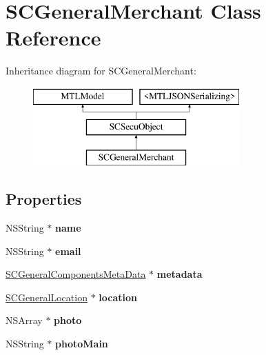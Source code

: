\hypertarget{interface_s_c_general_merchant}{}\section{S\+C\+General\+Merchant Class Reference}
\label{interface_s_c_general_merchant}
Inheritance diagram for S\+C\+General\+Merchant\+:\begin{figure}[H]
\begin{center}
\leavevmode
\includegraphics[height=3.000000cm]{interface_s_c_general_merchant}
\end{center}
\end{figure}
\subsection*{Properties}
\begin{DoxyCompactItemize}
\item 
N\+S\+String $\ast$ {\bfseries name}\hypertarget{interface_s_c_general_merchant_a9df90bf0f3cc8ef79dcb7779d43f4e20}{}\label{interface_s_c_general_merchant_a9df90bf0f3cc8ef79dcb7779d43f4e20}

\item 
N\+S\+String $\ast$ {\bfseries email}\hypertarget{interface_s_c_general_merchant_af5798e1548df7f7b027a50bb4104374f}{}\label{interface_s_c_general_merchant_af5798e1548df7f7b027a50bb4104374f}

\item 
\hyperlink{interface_s_c_general_components_meta_data}{S\+C\+General\+Components\+Meta\+Data} $\ast$ {\bfseries metadata}\hypertarget{interface_s_c_general_merchant_a5b30b17e6f83982772c31f976f90af62}{}\label{interface_s_c_general_merchant_a5b30b17e6f83982772c31f976f90af62}

\item 
\hyperlink{interface_s_c_general_location}{S\+C\+General\+Location} $\ast$ {\bfseries location}\hypertarget{interface_s_c_general_merchant_acb2778b70594939b0b269db1eddf85b3}{}\label{interface_s_c_general_merchant_acb2778b70594939b0b269db1eddf85b3}

\item 
N\+S\+Array $\ast$ {\bfseries photo}\hypertarget{interface_s_c_general_merchant_a2b06e74095bbe9a064d2018230b31053}{}\label{interface_s_c_general_merchant_a2b06e74095bbe9a064d2018230b31053}

\item 
N\+S\+String $\ast$ {\bfseries photo\+Main}\hypertarget{interface_s_c_general_merchant_a472c37606369f898d336e20b1eb38480}{}\label{interface_s_c_general_merchant_a472c37606369f898d336e20b1eb38480}

\end{DoxyCompactItemize}
